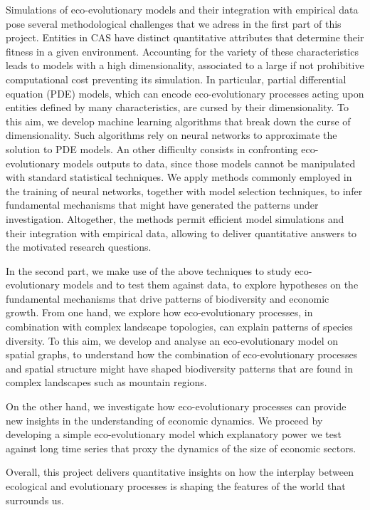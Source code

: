 Simulations of eco-evolutionary models and their integration with empirical data pose several methodological challenges that we adress in the first part of this project. Entities in CAS have distinct quantitative attributes that determine their fitness in a given environment. Accounting for the variety of these characteristics leads to models with a high dimensionality, associated to a large if not prohibitive computational cost preventing its simulation. In particular, partial differential equation (PDE) models, which can encode eco-evolutionary processes acting upon entities defined by many characteristics, are cursed by their dimensionality. To this aim, we develop machine learning algorithms that break down the curse of dimensionality. Such algorithms rely on neural networks to approximate the solution to PDE models. An other difficulty consists in confronting eco-evolutionary models outputs to data, since those models cannot be manipulated with standard statistical techniques. We apply methods commonly employed in the training of neural networks, together with model selection techniques, to infer fundamental mechanisms that might have generated the patterns under investigation. Altogether, the methods permit efficient model simulations and their integration with empirical data, allowing to deliver quantitative answers to the motivated research questions.

In the second part, we make use of the above techniques to study eco-evolutionary models and to test them against data, to explore hypotheses on the fundamental mechanisms that drive patterns of biodiversity and economic growth. From one hand, we explore how eco-evolutionary processes, in combination with complex landscape topologies, can explain patterns of species diversity. To this aim, we develop and analyse an eco-evolutionary model on spatial graphs, to understand how the combination of eco-evolutionary processes and spatial structure might have shaped biodiversity patterns that are found in complex landscapes such as mountain regions. 

On the other hand, we investigate how eco-evolutionary processes can provide new insights in the understanding of economic dynamics. We proceed by developing a simple eco-evolutionary model which explanatory power we test against long time series that proxy the dynamics of the size of economic sectors. 

Overall, this project delivers quantitative insights on how the interplay between ecological and evolutionary processes is shaping the features of the world that surrounds us.


